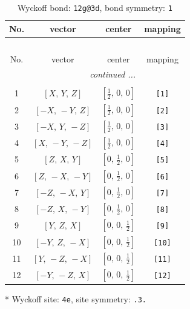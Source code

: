 \documentclass[fleqn,8pt]{jsarticle}
\begin{document}
\begin{longtable}{cccc}
\caption{Wyckoff bond: {\tt 12g@3d}, bond symmetry: {\tt 1}}
 \\
 \hline \hline
No. & vector & center & mapping \\ \hline \endfirsthead

\multicolumn{3}{l}{\tablename\ \thetable{}} \\
 \hline \hline
No. & vector & center & mapping \\ \hline \endhead

 \hline \hline
\multicolumn{3}{r}{\footnotesize\it continued ...} \\ \endfoot

 \hline \hline
\multicolumn{3}{r}{} \\ \endlastfoot

1 & $\left[ X,\, Y,\, Z \right]$ & $\left[ \frac{1}{2},\, 0,\, 0 \right]$ & {\tt [1]} \\ \hline
2 & $\left[ - X,\, - Y,\, Z \right]$ & $\left[ \frac{1}{2},\, 0,\, 0 \right]$ & {\tt [2]} \\ \hline
3 & $\left[ - X,\, Y,\, - Z \right]$ & $\left[ \frac{1}{2},\, 0,\, 0 \right]$ & {\tt [3]} \\ \hline
4 & $\left[ X,\, - Y,\, - Z \right]$ & $\left[ \frac{1}{2},\, 0,\, 0 \right]$ & {\tt [4]} \\ \hline
5 & $\left[ Z,\, X,\, Y \right]$ & $\left[ 0,\, \frac{1}{2},\, 0 \right]$ & {\tt [5]} \\ \hline
6 & $\left[ Z,\, - X,\, - Y \right]$ & $\left[ 0,\, \frac{1}{2},\, 0 \right]$ & {\tt [6]} \\ \hline
7 & $\left[ - Z,\, - X,\, Y \right]$ & $\left[ 0,\, \frac{1}{2},\, 0 \right]$ & {\tt [7]} \\ \hline
8 & $\left[ - Z,\, X,\, - Y \right]$ & $\left[ 0,\, \frac{1}{2},\, 0 \right]$ & {\tt [8]} \\ \hline
9 & $\left[ Y,\, Z,\, X \right]$ & $\left[ 0,\, 0,\, \frac{1}{2} \right]$ & {\tt [9]} \\ \hline
10 & $\left[ - Y,\, Z,\, - X \right]$ & $\left[ 0,\, 0,\, \frac{1}{2} \right]$ & {\tt [10]} \\ \hline
11 & $\left[ Y,\, - Z,\, - X \right]$ & $\left[ 0,\, 0,\, \frac{1}{2} \right]$ & {\tt [11]} \\ \hline
12 & $\left[ - Y,\, - Z,\, X \right]$ & $\left[ 0,\, 0,\, \frac{1}{2} \right]$ & {\tt [12]} \\
\end{longtable}
* Wyckoff site: {\tt 4e}, site symmetry: {\tt .3.}
\end{document}
